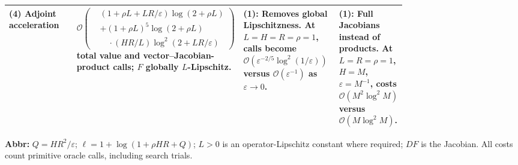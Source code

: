 \begin{table}[tp]
\begin{threeparttable}
\begin{tabularx}{\linewidth}{@{}>{\raggedright\arraybackslash}p{0.20\linewidth}>{\raggedright\arraybackslash}p{0.32\linewidth}>{\raggedright\arraybackslash}p{0.25\linewidth}>{\raggedright\arraybackslash}X@{}}
\midrule
\textbf{(4)} Adjoint acceleration \citep{cnAdjointSource} & $\mathcal{O}\!\left(\begin{aligned}&(1+\rho L+LR/\varepsilon)\log(2+\rho L)\\&+(1+\rho L)^5\log(2+\rho L)\\&\quad\cdot(HR/L)\log^2(2+LR/\varepsilon)\end{aligned}\right)$ total value and vector--Jacobian-product calls; $F$ globally $L$-Lipschitz. & \textbf{(1)}: Removes global Lipschitzness. At $L=H=R=\rho=1$, calls become $\mathcal{O}(\varepsilon^{-2/5}\log^2(1/\varepsilon))$ versus $\mathcal{O}(\varepsilon^{-1})$ as $\varepsilon\to0$. & \textbf{(1)}: Full Jacobians instead of products. At $L=R=\rho=1$, $H=M$, $\varepsilon=M^{-1}$, costs $\mathcal{O}(M^2\log^2 M)$ versus $\mathcal{O}(M\log^2 M)$. \\
\bottomrule
\end{tabularx}
\begin{tablenotes}[flushleft]\footnotesize
\item[] \textbf{Abbr:} $Q=HR^2/\varepsilon$; $\ell=1+\log(1+\rho HR+Q)$; $L>0$ is an operator-Lipschitz constant where required; $DF$ is the Jacobian. All costs count primitive oracle calls, including search trials.
\end{tablenotes}
\end{threeparttable}
\end{table}
\clearpage
